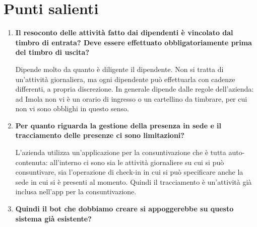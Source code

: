 \documentclass[11pt]{article}
\begin{document}
	\section{Punti salienti}
		\begin{enumerate}
			\item \textbf{Il resoconto delle attività fatto dai dipendenti è vincolato dal timbro di entrata? Deve essere effettuato obbligatoriamente prima del timbro di uscita?}
			
			\medskip
			
			Dipende molto da quanto è diligente il dipendente. Non si tratta di un'attività giornaliera, ma ogni dipendente può effettuarla con cadenze differenti, a propria discrezione. In generale dipende dalle regole dell'azienda: ad Imola non vi è un orario di ingresso o un cartellino da timbrare, per cui non vi sono obblighi in questo senso. 
			
			\bigskip
			
			\item \textbf{Per quanto riguarda la gestione della presenza in sede e il tracciamento delle presenze ci sono limitazioni?}
			
			\medskip 
			
			L'azienda utilizza un'applicazione per la consuntivazione che è tutta auto-contenuta: all'interno ci sono sia le attività giornaliere su cui si può consuntivare, sia l'operazione di check-in in cui si può specificare anche la sede in cui si è presenti al momento. Quindi il tracciamento è un'attività già inclusa nell'app per la consuntivazione.
			
			\bigskip 
			
			\item \textbf{Quindi il bot che dobbiamo creare si appoggerebbe su questo sistema già esistente?}
			
			\medskip
			

\end{enumerate}
\end{document}
